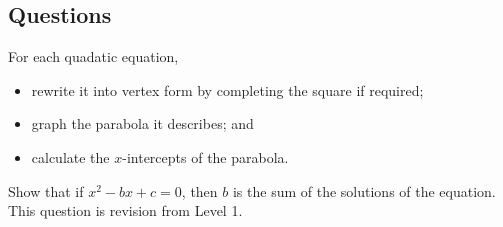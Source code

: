 \subsection*{Questions}
\begin{questions}
  \question For each quadatic equation,
            \begin{itemize}
              \item rewrite it into vertex form by completing the square if required;
              \item graph the parabola it describes; and
              \item calculate the $ x$-intercepts of the parabola.
            \end{itemize}
  \question Show that if $ x^2 - bx + c = 0 $, then $ b $ is the sum of the solutions of the equation.
  \question This question is revision from Level 1.
\end{questions}
